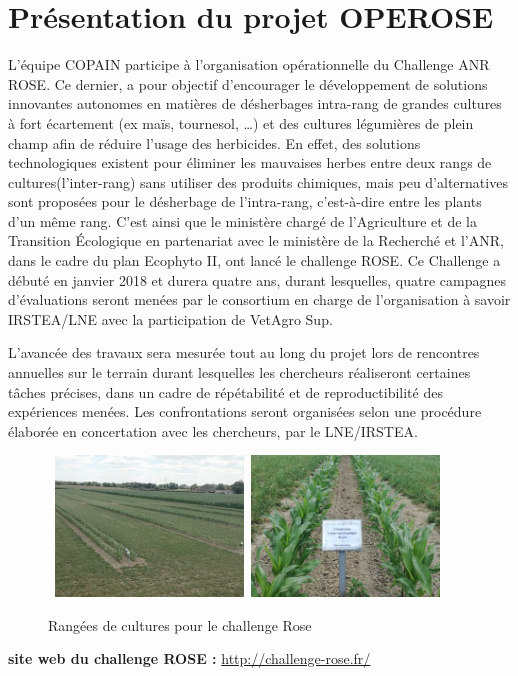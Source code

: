 \section{Présentation du projet OPEROSE}
L’équipe COPAIN participe à l’organisation opérationnelle du Challenge \gls{ANR} \gls{ROSE}. Ce dernier, a pour objectif d’encourager le développement de solutions innovantes autonomes en matières de désherbages intra-rang de grandes cultures à fort écartement (ex maïs, tournesol, …) et des cultures légumières de plein champ afin de réduire l’usage des herbicides. En effet, des solutions technologiques existent pour éliminer les mauvaises herbes entre deux rangs de cultures(l’inter-rang) sans utiliser des produits chimiques, mais peu d’alternatives sont proposées pour le désherbage de l’intra-rang, c’est-à-dire entre les plants d’un même rang. C’est ainsi que le ministère chargé de l’Agriculture et de la Transition Écologique en partenariat avec le ministère de la Recherché et l’ANR, dans le cadre du plan Ecophyto II, ont lancé le challenge ROSE.  Ce Challenge a débuté en janvier 2018 et durera quatre ans, durant lesquelles, quatre campagnes d’évaluations seront menées par le consortium en charge de l’organisation à savoir IRSTEA/LNE avec la participation de VetAgro Sup.  

L’avancée des travaux sera mesurée tout au long du projet lors de rencontres annuelles sur le terrain durant lesquelles les chercheurs réaliseront certaines tâches précises, dans un cadre de répétabilité et de reproductibilité des expériences menées. Les confrontations seront organisées selon une procédure élaborée en concertation avec les chercheurs, par le LNE/IRSTEA. 

\begin {figure}[!h]
\begin{center}

    \hbox{ 
    \includegraphics[width=5cm]{images/imageRang1.jpg}
    \hspace*{1cm}  %
    \includegraphics[width=5cm]{images/imageRang2.jpg}
  }
\caption{Rangées de cultures pour le challenge Rose}
\label{Rangées de cultures pour le challenge Rose}
\end{center}
\end {figure}
\textbf{site web du challenge ROSE : }\url{http://challenge-rose.fr/}


